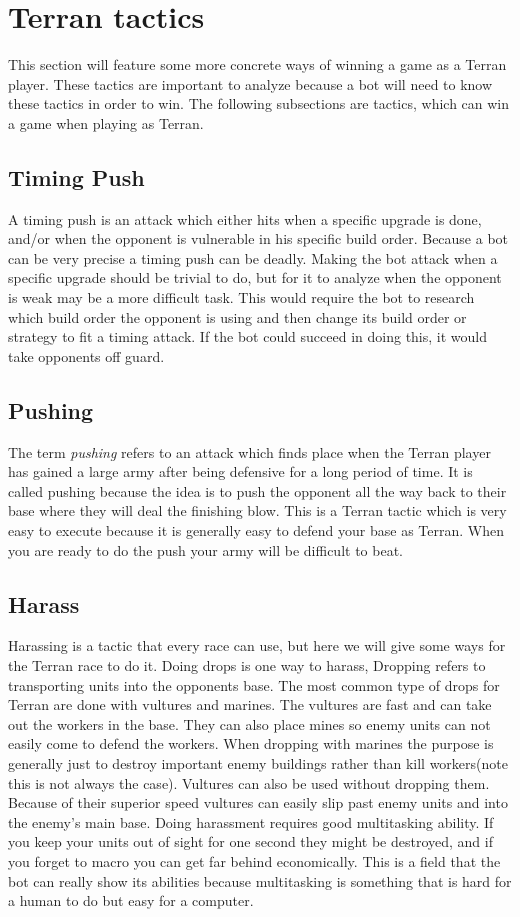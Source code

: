 \section{Terran tactics}
	This section will feature some more concrete ways of winning a game as a Terran player. 
	These tactics are important to analyze because a bot will need to know these tactics in order to win.
	The following subsections are tactics, which can win a game when playing as Terran.
	
	\subsection{Timing Push}
		A timing push is an attack which either hits when a specific upgrade is done, and/or when the opponent is vulnerable in his specific build order. 
		Because a bot can be very precise a timing push can be deadly. Making the bot attack when a specific upgrade should be trivial to do, but for it to 
		analyze when the opponent is weak may be a more difficult task. This would require the bot to research which build order the opponent is using and 
		then change its build order or strategy to fit a timing attack. If the bot could succeed in doing this, it would take opponents off guard.
		
	\subsection{Pushing}
		The term \textit{pushing} refers to an attack which finds place when the Terran player has gained a large army after being defensive for a long 
		period of time. It is called pushing because the idea is to push the opponent 
		all the way back to their base where they will deal the finishing blow. This is a Terran tactic which is very easy to execute because it is generally
		easy to defend your base as Terran. When you are ready to do the push your army will be difficult to beat.
		
	\subsection{Harass}
		Harassing is a tactic that every race can use, but here we will give some ways for the Terran race to do it. Doing drops is one way to harass, Dropping 
		refers to transporting units into the opponents base. The most common type of drops for Terran are done with vultures and marines. The vultures are 
		fast and can take out the workers in the base. They can also place mines so enemy units can not easily come to defend the workers. When dropping with marines 
		the purpose is generally just to destroy important enemy buildings rather than kill workers(note this is not always the case). Vultures can also be used without 
		dropping them. Because of their superior speed vultures can easily slip past enemy units and into the enemy's main base. Doing harassment requires 
		good multitasking ability. If you keep your units out of sight for one second they might be destroyed, and if you forget to macro you can 
		get far behind economically. This is a field that the bot can really show its abilities because multitasking is something that is hard for a human to do but 
		easy for a computer.
	
